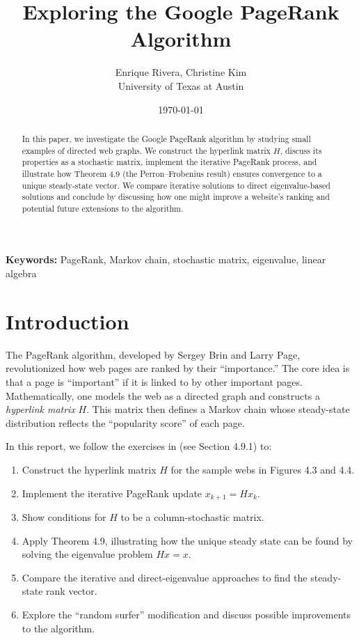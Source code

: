 \documentclass{article}
\title{\textbf{Exploring the Google PageRank Algorithm}}
\author{Enrique Rivera, Christine Kim \\ University of Texas at Austin}
\date{\today}
\begin{document}
\maketitle

\begin{abstract}
In this paper, we investigate the Google PageRank algorithm by studying small examples of directed web graphs. 
We construct the hyperlink matrix \(H\), discuss its properties as a stochastic matrix, implement the iterative PageRank process, 
and illustrate how Theorem 4.9 (the Perron--Frobenius result) ensures convergence to a unique steady-state vector. 
We compare iterative solutions to direct eigenvalue-based solutions and conclude by discussing how one might 
improve a website's ranking and potential future extensions to the algorithm.
\end{abstract}

\textbf{Keywords:} PageRank, Markov chain, stochastic matrix, eigenvalue, linear algebra

\section{Introduction}
The PageRank algorithm, developed by Sergey Brin and Larry Page, revolutionized how web pages 
are ranked by their ``importance.'' The core idea is that a page is ``important'' if it is linked to by 
other important pages. Mathematically, one models the web as a directed graph and constructs 
a \emph{hyperlink matrix} \(H\). This matrix then defines a Markov chain whose steady-state 
distribution reflects the ``popularity score'' of each page.

In this report, we follow the exercises in \cite{Sullivan2025Linear} (see Section 4.9.1) to:
\begin{enumerate}
  \item Construct the hyperlink matrix \(H\) for the sample webs in Figures 4.3 and 4.4.
  \item Implement the iterative PageRank update \(x_{k+1} = H x_k\).
  \item Show conditions for \(H\) to be a column-stochastic matrix.
  \item Apply Theorem 4.9, illustrating how the unique steady state can be found by solving the eigenvalue problem \(Hx = x\).
  \item Compare the iterative and direct-eigenvalue approaches to find the steady-state rank vector.
  \item Explore the ``random surfer'' modification and discuss possible improvements to the algorithm.
\end{enumerate}
\end{document}
